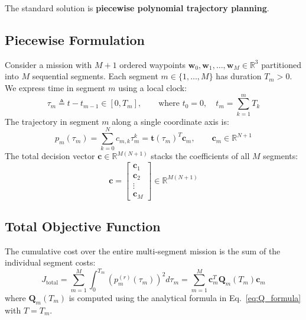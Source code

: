 \documentclass[11pt,a4paper]{article}
\begin{document}
The standard solution is \textbf{piecewise polynomial trajectory planning}.

\subsection{Piecewise Formulation}

Consider a mission with $M+1$ ordered waypoints $\mathbf{w}_0, \mathbf{w}_1, \dots, \mathbf{w}_M \in \mathbb{R}^3$ partitioned into $M$ sequential segments. Each segment $m \in \{1, \dots, M\}$ has duration $T_m > 0$. We express time in segment $m$ using a local clock:
\begin{equation}
\tau_m \triangleq t - t_{m-1} \in [0, T_m], \qquad \text{where } t_0 = 0, \quad t_m = \sum_{k=1}^m T_k
\end{equation}
The trajectory in segment $m$ along a single coordinate axis is:
\begin{equation}
p_m(\tau_m) = \sum_{k=0}^N c_{m, k} \tau_m^k = \mathbf{t}(\tau_m)^T \mathbf{c}_m, \qquad \mathbf{c}_m \in \mathbb{R}^{N+1}
\end{equation}
The total decision vector $\mathbf{c} \in \mathbb{R}^{M(N+1)}$ stacks the coefficients of all $M$ segments:
\begin{equation}
\mathbf{c} = \begin{bmatrix} \mathbf{c}_1 \\ \mathbf{c}_2 \\ \vdots \\ \mathbf{c}_M \end{bmatrix} \in \mathbb{R}^{M(N+1)}
\end{equation}

\subsection{Total Objective Function}

The cumulative cost over the entire multi-segment mission is the sum of the individual segment costs:
\begin{equation}
J_{\text{total}} = \sum_{m=1}^M \int_0^{T_m} \left( p_m^{(r)}(\tau_m) \right)^2 d\tau_m
= \sum_{m=1}^M \mathbf{c}_m^T \mathbf{Q}_m(T_m) \mathbf{c}_m
\end{equation}
where $\mathbf{Q}_m(T_m)$ is computed using the analytical formula in Eq.~\eqref{eq:Q_formula} with $T = T_m$.
\end{document}
